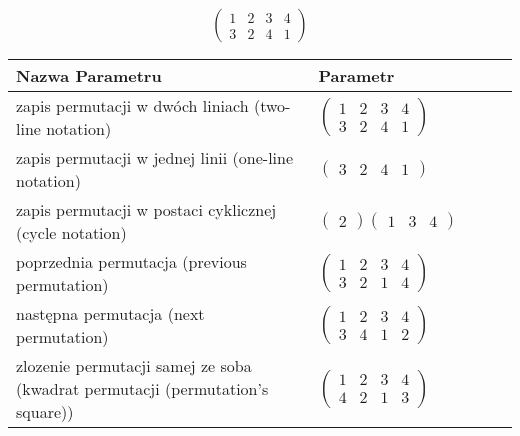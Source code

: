 \documentclass[12pt]{article}
\begin{document}
\subsection{}
\begin{center}
\[
\begin{pmatrix}
	1 & 2 & 3 & 4 \\ 
	3 & 2 & 4 & 1 
\end{pmatrix}
\]

\begin{tabular}{|m{0.6\linewidth}|m{0.4\linewidth}|}
	\hline
	Nazwa Parametru & Parametr \\
	\hline
	zapis permutacji w dwóch liniach (two-line notation) & $\begin{pmatrix} 1 & 2 & 3 & 4 \\ 
3 & 2 & 4 & 1 \end{pmatrix}$ \\ 
	\hline
	zapis permutacji w jednej linii (one-line notation) & $\begin{pmatrix} 3 & 2 & 4 & 1 \end{pmatrix}$ \\ 
	\hline
	zapis permutacji w postaci cyklicznej (cycle notation) & $\begin{pmatrix} 2 \end{pmatrix} \begin{pmatrix} 1 & 3 & 4 \end{pmatrix} $ \\ 
	\hline
	poprzednia permutacja (previous permutation) & $\begin{pmatrix} 1 & 2 & 3 & 4 \\ 
3 & 2 & 1 & 4 \end{pmatrix}$ \\ 
	\hline
	następna permutacja (next permutation) & $\begin{pmatrix} 1 & 2 & 3 & 4 \\ 
3 & 4 & 1 & 2 \end{pmatrix}$ \\ 
	\hline
	zlozenie permutacji samej ze soba (kwadrat permutacji (permutation's square)) & $\begin{pmatrix} 1 & 2 & 3 & 4 \\ 
4 & 2 & 1 & 3 \end{pmatrix}$ \\ 
	\hline
\end{tabular}
\end{center}
\end{document}
